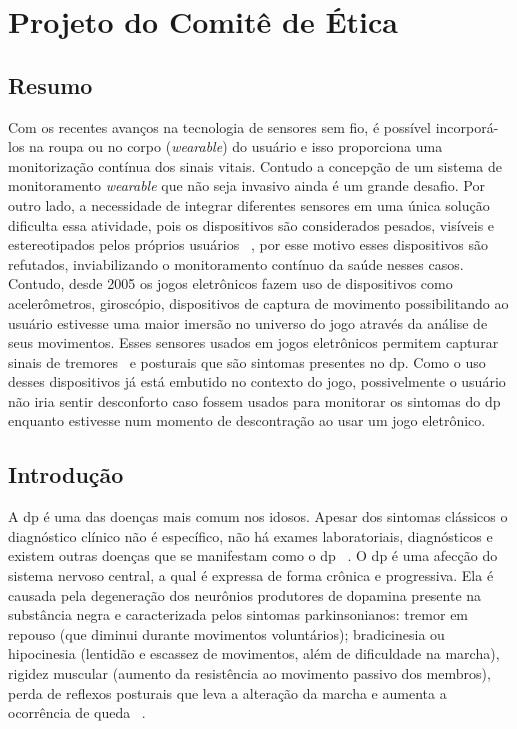 \chapter{Projeto do Comitê de Ética} \label{sec:comite}
\section{Resumo}
Com os recentes avanços na tecnologia de sensores sem fio, é possível incorporá-los na roupa ou no corpo (\textit{wearable}) do usuário e isso proporciona uma monitorização contínua dos sinais vitais. Contudo a concepção de um sistema de monitoramento \textit{wearable} que não seja invasivo ainda é um grande desafio. Por outro lado, a necessidade de integrar diferentes sensores em uma única solução dificulta essa atividade, pois os dispositivos são considerados pesados, visíveis e estereotipados pelos próprios usuários ~\cite{aarhus_negotiating_2010}, por esse motivo esses dispositivos são refutados, inviabilizando o monitoramento contínuo da saúde nesses casos. Contudo, desde 2005 os jogos eletrônicos fazem uso de dispositivos como acelerômetros, giroscópio, dispositivos de captura de movimento possibilitando ao usuário estivesse uma maior imersão no universo do jogo através da análise de seus movimentos. Esses sensores usados em jogos eletrônicos permitem capturar sinais  de tremores~\cite{lemoyne2010} 
e posturais que são sintomas presentes no \ac{dp}. Como o uso desses dispositivos já está embutido no contexto do jogo, possivelmente o usuário não iria sentir desconforto caso fossem usados para monitorar os sintomas do \ac{dp} enquanto estivesse num momento de descontração ao usar um jogo eletrônico. 

\section{Introdução}
A \ac{dp} é uma das doenças mais comum nos idosos. Apesar dos sintomas clássicos o diagnóstico clínico não é específico, não há exames laboratoriais, diagnósticos e existem outras doenças que se manifestam como o \ac{dp} ~\cite{abn2010,tolosa06}. O \ac{dp} é uma afecção do sistema nervoso central, a qual é expressa de forma crônica e progressiva. Ela é causada pela degeneração dos neurônios produtores de dopamina presente na substância negra e caracterizada pelos sintomas parkinsonianos: tremor em repouso (que diminui durante movimentos voluntários); bradicinesia ou hipocinesia (lentidão e escassez de movimentos, além de dificuldade na marcha), rigidez muscular (aumento da resistência ao movimento passivo dos membros), perda de reflexos posturais que leva a alteração da marcha e aumenta a ocorrência de queda ~\cite{tolosa06,abn2010}. 

